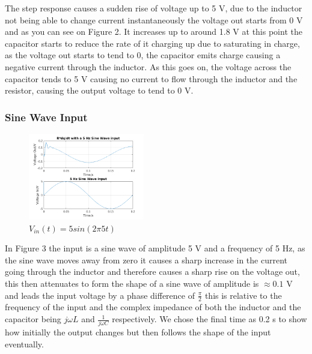 \documentclass[11pt,a4paper]{article}
\begin{document}
    \vspace{0mm}The step response causes a sudden rise of voltage up to 5 V, due to the inductor not being able to change current instantaneously the voltage out starts from 0 V and as you can see on Figure 2. It increases up to around 1.8 V at this point the capacitor starts to reduce the rate of it charging up due to saturating in charge, as the voltage out starts to tend to 0, the capacitor emits charge causing a negative current through the inductor. As this goes on, the voltage across the capacitor tends to 5 V causing no current to flow through the inductor and the resistor, causing the output voltage to tend to 0 V.

\subsubsection{Sine Wave Input}

\begin{figure}
    \vspace{-5mm}

  		\includegraphics[width=0.45\textwidth]{Ex3_Figs/5Sine2.png}
	\vspace{-6mm}
  	\caption{$V_{in}(t)= 5sin(2 \pi 5t)$}
  	\label{fig:ex3g2}

\end{figure}

\vspace{0mm}In Figure 3 the input is a sine wave of amplitude 5 V and a frequency of 5 Hz, as the sine wave moves away from zero it causes a sharp increase in the current going through the inductor and therefore causes a sharp rise on the voltage out, this then attenuates to form the shape of a sine wave of amplitude is $\approx 0.1$ V and leads the input voltage by a phase difference of $\frac{\pi}{2}$ this is relative to the frequency of the input and the complex impedance of both the inductor and the capacitor being $j\omega L$ and $\frac{1}{j\omega C}$ respectively. We chose the final time as 0.2 s to show how initially the output changes but then follows the shape of the input eventually.
\end{document}
